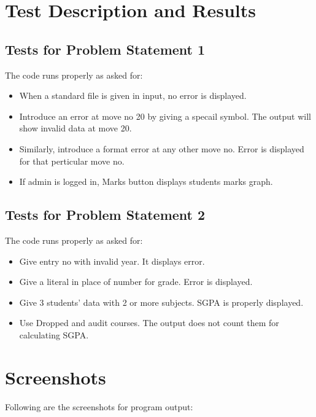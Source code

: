 \documentclass[12pt]{article}
\begin{document}
\newpage



\section{Test Description and Results}
\subsection{Tests for Problem Statement 1}
The code runs properly as asked for:
\begin{itemize}
\item
When a standard file is given in input, no error is displayed. 
\item
Introduce an error at move no 20 by giving a specail symbol. The output will show invalid data at move 20.
\item
Similarly, introduce a format error at any other move no. Error is displayed for that perticular move no.
\item
If admin is logged in, Marks button displays students marks graph.

\end{itemize}

\subsection{Tests for Problem Statement 2}
The code runs properly as asked for:
\begin{itemize}
\item
Give entry no with invalid year. It displays error.
\item
Give a literal in place of number for grade. Error is displayed.
\item
Give 3 students' data with 2 or more subjects. SGPA is properly displayed.
\item
Use Dropped and audit courses. The output does not count them for calculating SGPA.

\end{itemize}




\newpage
\section{Screenshots}

Following are the screenshots for program output:
\end{document}
